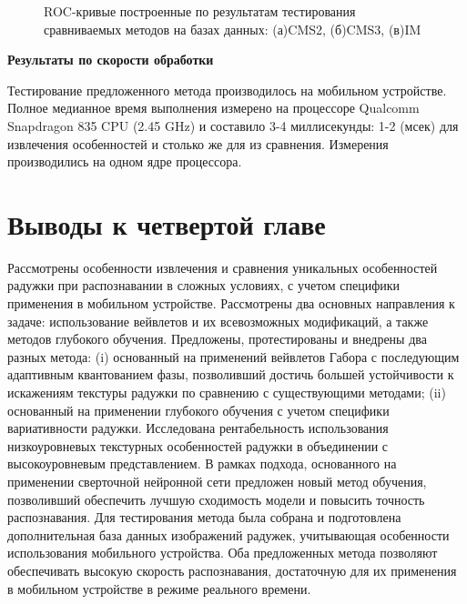\begin{figure}[!h]
\begin{subfigure}{.33\textwidth}
		\caption{}
		\label{fig:roc-extreme}
	\end{subfigure}%
	\caption{ROC-кривые построенные по результатам тестирования сравниваемых методов на базах данных: (а)CMS2, (б)CMS3, (в)IM}
	\label{fig:roc-curves}
\end{figure}

{\bf Результаты по скорости обработки}
\label{sec:fem-nn-exp-results-speed}

Тестирование предложенного метода производилось на мобильном устройстве. Полное медианное время выполнения измерено на процессоре Qualcomm Snapdragon 835 CPU (2.45 GHz) и составило 3-4 миллисекунды: 1-2 (мсек) для извлечения особенностей и столько же для из сравнения. Измерения производились на одном ядре процессора.

\section{Выводы к четвертой главе}
\label{sec:conclusion-4}

Рассмотрены особенности извлечения и сравнения уникальных особенностей радужки при распознавании в сложных условиях, с учетом специфики применения в мобильном устройстве. Рассмотрены два основных направления к задаче: использование вейвлетов и их всевозможных модификаций, а также методов глубокого обучения. Предложены, протестированы и внедрены два разных метода: (i) основанный на применений вейвлетов Габора с последующим адаптивным квантованием фазы, позволивший достичь большей устойчивости к искажениям текстуры радужки по сравнению с существующими методами; (ii) основанный на применении глубокого обучения с учетом специфики вариативности радужки. Исследована рентабельность использования низкоуровневых текстурных особенностей радужки в объединении с высокоуровневым представлением. В рамках подхода, основанного на применении сверточной нейронной сети предложен новый метод обучения, позволивший обеспечить лучшую сходимость модели и повысить точность распознавания. Для тестирования метода была собрана и подготовлена дополнительная база данных изображений радужек, учитывающая особенности использования мобильного устройства. Оба предложенных метода позволяют обеспечивать высокую скорость распознавания, достаточную для их применения в мобильном устройстве в режиме реального времени.